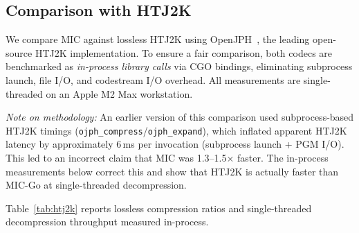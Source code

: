 \documentclass[11pt,twocolumn]{article}
\begin{document}
\subsection{Comparison with HTJ2K}
\label{sec:htj2k}

We compare MIC against lossless HTJ2K using OpenJPH~\cite{openjph},
the leading open-source HTJ2K implementation.
To ensure a fair comparison, both codecs are benchmarked as \emph{in-process library calls}
via CGO bindings, eliminating subprocess launch, file I/O, and codestream I/O overhead.
All measurements are single-threaded on an Apple M2 Max workstation.

\emph{Note on methodology:} An earlier version of this comparison used subprocess-based HTJ2K
timings (\texttt{ojph\_compress}/\texttt{ojph\_expand}), which inflated apparent HTJ2K latency by
approximately 6\,ms per invocation (subprocess launch + PGM I/O).
This led to an incorrect claim that MIC was 1.3--1.5$\times$ faster.
The in-process measurements below correct this and show that HTJ2K is actually faster than
MIC-Go at single-threaded decompression.

Table~\ref{tab:htj2k} reports lossless compression ratios and single-threaded
decompression throughput measured in-process.
\end{document}
